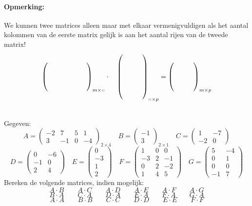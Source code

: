 \documentclass[12pt,twoside]{article}
\begin{document}
\paragraph*{Opmerking:} We kunnen twee matrices alleen maar met elkaar vermenigvuldigen als het aantal kolommen van de eerste matrix gelijk is aan het aantal rijen van de tweede matrix!
\[
  \begin{pmatrix}
    \vspace{1cm}\hspace{2cm}
  \end{pmatrix}_{m \times \textcolor{gray}{n}}
    \cdot\quad
  \begin{pmatrix}
    \vspace{2cm}\hspace{1cm}
  \end{pmatrix}_{\textcolor{gray}{n} \times p}
    =
  \begin{pmatrix}
    \vspace{1cm}\hspace{1cm}
  \end{pmatrix}_{m \times p}
\]

\begin{oefening}\\
Gegeven:
\[
A=\begin{pmatrix}
  -2 & 7 & 5 & 1\\
  3 & -1 & 0 & -4
\end{pmatrix}_{2 \times 4}
\quad
B=\begin{pmatrix}
  -1\\
  3
\end{pmatrix}_{2 \times 1}
\quad
C=\begin{pmatrix}
  1 & -7\\
  -2 & 0
\end{pmatrix}
\]\[
D=\begin{pmatrix}
  0 & -6\\
  -1 & 0\\
  2 & 4
\end{pmatrix}
\quad
E=\begin{pmatrix}
  0\\
  -3\\
  1\\
  2
\end{pmatrix}
\quad
F=\begin{pmatrix}
  1 & 0 & 0\\
  -3 & 2 & -1\\
  0 & 2 & -2\\
  1 & 4 & 5
\end{pmatrix}
\quad
G=\begin{pmatrix}
  5 & -4\\
  0 & 1\\
  0 & 0\\
  -1 & 7
\end{pmatrix}
\]
Bereken de volgende matrices, indien mogelijk:
\[A \cdot B \qquad A \cdot C \qquad A \cdot D \qquad A \cdot E \qquad A \cdot F \qquad A \cdot G\]
\[B \cdot A \qquad C \cdot A \qquad D \cdot A \qquad E \cdot A \qquad F \cdot A \qquad G \cdot A\]
\[A \cdot A \qquad B \cdot B \qquad C \cdot C \qquad D \cdot D \qquad E \cdot E \qquad F \cdot F\]
\end{oefening}
\end{document}
